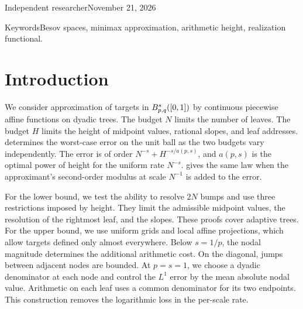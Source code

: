 \documentclass[11pt,a4paper]{article}
\begin{document}
  {Independent researcher}{November 21, 2026}{}

{Keywords}{Besov spaces, minimax approximation, arithmetic height, realization functional.}

\section{Introduction}
\label{lp:sec:intro}

We consider approximation of targets in $B^{s}_{p,q}([0,1])$ by continuous piecewise affine functions on dyadic trees. The budget $N$ limits the number of leaves. The budget $H$ limits the height of midpoint values, rational slopes, and leaf addresses.  determines the worst-case error on the unit ball as the two budgets vary independently. The error is of order $N^{-s}+H^{-s/a(p,s)}$, and $a(p,s)$ is the optimal power of height for the uniform rate $N^{-s}$.  gives the same law when the approximant's second-order modulus at scale $N^{-1}$ is added to the error.

For the lower bound, we test the ability to resolve $2N$ bumps and use three restrictions imposed by height. They limit the admissible midpoint values, the resolution of the rightmost leaf, and the slopes. These proofs cover adaptive trees. For the upper bound, we use uniform grids and local affine projections, which allow targets defined only almost everywhere. Below $s=1/p$, the nodal magnitude determines the additional arithmetic cost. On the diagonal, jumps between adjacent nodes are bounded. At $p=s=1$, we choose a dyadic denominator at each node and control the $L^1$ error by the mean absolute nodal value. Arithmetic on each leaf uses a common denominator for its two endpoints. This construction removes the logarithmic loss in the per-scale rate.
\end{document}
